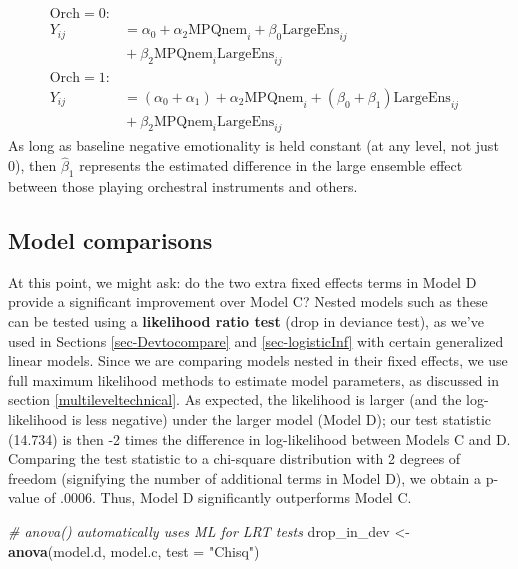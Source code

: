 \documentclass[
]{krantz}
\newenvironment{Shaded}{\begin{snugshade}}{\end{snugshade}}
\newcommand{\CommentTok}[1]{\textcolor[rgb]{0.37,0.37,0.37}{\textit{#1}}}
\newcommand{\DataTypeTok}[1]{\textcolor[rgb]{0.27,0.27,0.27}{#1}}
\newcommand{\KeywordTok}[1]{\textcolor[rgb]{0.27,0.27,0.27}{\textbf{#1}}}
\newcommand{\NormalTok}[1]{#1}
\newcommand{\StringTok}[1]{\textcolor[rgb]{0.5,0.5,0.5}{#1}}
\begin{document}
\begin{align*}
\textrm{Orch}=0: & & \\
Y_{ij} & = \alpha_{0}+\alpha_{2}\textrm{MPQnem}_{i}+\beta_{0}\textrm{LargeEns}_{ij} \\
 & \textrm{} +\beta_{2}\textrm{MPQnem}_{i}\textrm{LargeEns}_{ij} \\
\textrm{Orch}=1: & \\
Y_{ij} & = (\alpha_{0}+\alpha_{1})+\alpha_{2}\textrm{MPQnem}_{i}+(\beta_{0}+\beta_{1})\textrm{LargeEns}_{ij} \\
 & \textrm{} +\beta_{2}\textrm{MPQnem}_{i}\textrm{LargeEns}_{ij}
\end{align*}
As long as baseline negative emotionality is held constant (at any level, not just 0), then \(\hat{\beta}_{1}\) represents the estimated difference in the large ensemble effect between those playing orchestral instruments and others.

\hypertarget{compare:modeld}{%
\subsection{Model comparisons}\label{compare:modeld}}

At this point, we might ask: do the two extra fixed effects terms in Model D provide a significant improvement over Model C? Nested models such as these can be tested using a \textbf{likelihood ratio test}  (drop in deviance test),  as we've used in Sections \ref{sec-Devtocompare} and \ref{sec-logisticInf} with certain generalized linear models. Since we are comparing models nested in their fixed effects, we use full maximum likelihood methods to estimate model parameters, as discussed in section \ref{multileveltechnical}. As expected, the likelihood is larger (and the log-likelihood is less negative) under the larger model (Model D); our test statistic (14.734) is then -2 times the difference in log-likelihood between Models C and D. Comparing the test statistic to a chi-square distribution with 2 degrees of freedom (signifying the number of additional terms in Model D), we obtain a p-value of .0006. Thus, Model D significantly outperforms Model C.

\begin{Shaded}
\begin{Highlighting}[]
\CommentTok{# anova() automatically uses ML for LRT tests}
\NormalTok{drop_in_dev <-}\StringTok{ }\KeywordTok{anova}\NormalTok{(model.d, model.c, }\DataTypeTok{test =} \StringTok{"Chisq"}\NormalTok{)}
\end{Highlighting}
\end{Shaded}
\end{document}
